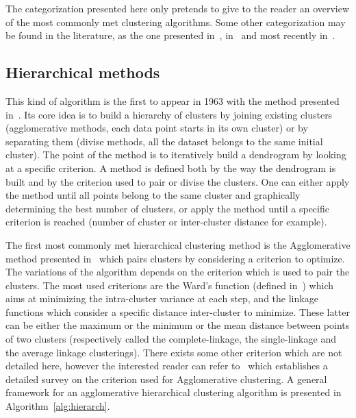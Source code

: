     The categorization presented here only pretends to give to the reader an overview of the most commonly met clustering algorithms. Some other categorization may be found in the literature, as the one presented in~\cite{jain1999data}, in~\cite{xu2005survey} and most recently in~\cite{fahad2014survey}.

    \subsection{Hierarchical methods}

    This kind of algorithm is the first to appear in 1963 with the method presented in~\cite{ward1963hierarchical}. Its core idea is to build a hierarchy of clusters by joining existing clusters (agglomerative methods, each data point starts in its own cluster) or by separating them (divise methods, all the dataset belongs to the same initial cluster). The point of the method is to iteratively build a dendrogram by looking at a specific criterion. A method is defined both by the way the dendrogram is built and by the criterion used to pair or divise the clusters. One can either apply the method until all points belong to the same cluster and graphically determining the best number of clusters, or apply the method until a specific criterion is reached (number of cluster or inter-cluster distance for example).

    The first most commonly met hierarchical clustering method is the Agglomerative method presented in~\cite{ward1963hierarchical} which pairs clusters by considering a criterion to optimize. The variations of the algorithm depends on the criterion which is used to pair the clusters. The most used criterions are the Ward's function (defined in~\cite{ward1963hierarchical}) which aims at minimizing the intra-cluster variance at each step, and the linkage functions which consider a specific distance inter-cluster to minimize. These latter can be either the maximum or the minimum or the mean distance between points of two clusters (respectively called the complete-linkage, the single-linkage and the average linkage clusterings). There exists some other criterion which are not detailed here, however the interested reader can refer to~\cite{murtagh1983survey} which establishes a detailed survey on the criterion used for Agglomerative clustering. A general framework for an agglomerative hierarchical clustering algorithm is presented in Algorithm~\ref{alg:hierarch}.\\

